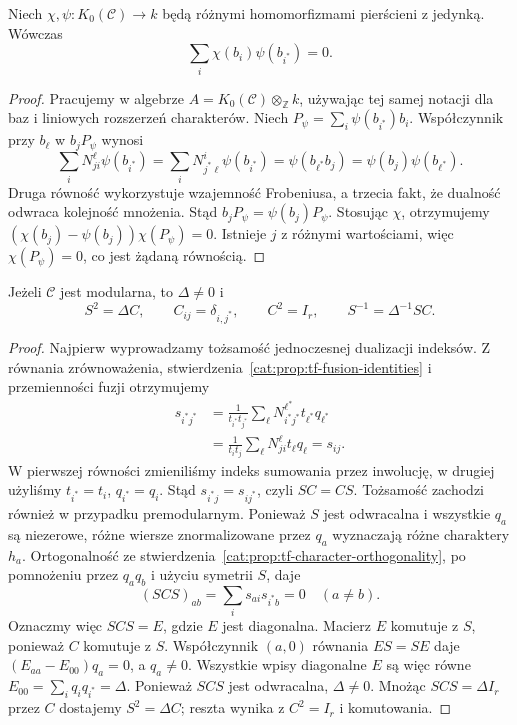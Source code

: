 \begin{stwierdzenie}\label{cat:prop:tf-character-orthogonality}
Niech $\chi,\psi:K_0(\mathcal C)\to k$ będą różnymi homomorfizmami pierścieni z jedynką. Wówczas
\[
 \sum_i\chi(b_i)\psi(b_{i^*})=0.
\]
\end{stwierdzenie}
\begin{proof}
Pracujemy w algebrze $A=K_0(\mathcal C)\otimes_{\mathbb Z}k$, używając tej samej notacji dla baz i liniowych rozszerzeń charakterów. Niech
$P_\psi=\sum_i\psi(b_{i^*})b_i$.
Współczynnik przy $b_\ell$ w $b_jP_\psi$ wynosi
\[
 \sum_i N_{ji}^{\ell}\psi(b_{i^*})
 =\sum_i N_{j^*\ell}^{i}\psi(b_{i^*})
 =\psi(b_{\ell^*}b_j)
 =\psi(b_j)\psi(b_{\ell^*}).
\]
Druga równość wykorzystuje wzajemność Frobeniusa, a trzecia fakt, że dualność odwraca kolejność mnożenia. Stąd $b_jP_\psi=\psi(b_j)P_\psi$. Stosując $\chi$, otrzymujemy $(\chi(b_j)-\psi(b_j))\chi(P_\psi)=0$. Istnieje $j$ z różnymi wartościami, więc $\chi(P_\psi)=0$, co jest żądaną równością.
\end{proof}

\begin{twierdzenie}\label{cat:thm:tf-s-square}
Jeżeli $\mathcal C$ jest modularna, to $\Delta\neq0$ i
\[
 S^2=\Delta C,\qquad
 C_{ij}=\delta_{i,j^*},\qquad C^2=I_r,
 \qquad S^{-1}=\Delta^{-1}SC.
\]
\end{twierdzenie}
\begin{proof}
Najpierw wyprowadzamy tożsamość jednoczesnej dualizacji indeksów. Z równania zrównoważenia, stwierdzenia~\ref{cat:prop:tf-fusion-identities} i przemienności fuzji otrzymujemy
\[
\begin{aligned}
 s_{i^*j^*}
 &=\frac{1}{t_{i^*}t_{j^*}}
   \sum_\ell N_{i^*j^*}^{\ell^*}t_{\ell^*}q_{\ell^*}\\
 &=\frac{1}{t_it_j}\sum_\ell N_{ji}^{\ell}t_\ell q_\ell
 =s_{ij}.
\end{aligned}
\]
W pierwszej równości zmieniliśmy indeks sumowania przez inwolucję, w drugiej użyliśmy $t_{i^*}=t_i$, $q_{i^*}=q_i$. Stąd $s_{i^*j}=s_{ij^*}$, czyli $SC=CS$. Tożsamość zachodzi również w przypadku premodularnym. Ponieważ $S$ jest odwracalna i wszystkie $q_a$ są niezerowe, różne wiersze znormalizowane przez $q_a$ wyznaczają różne charaktery $h_a$. Ortogonalność ze stwierdzenia~\ref{cat:prop:tf-character-orthogonality}, po pomnożeniu przez $q_aq_b$ i użyciu symetrii $S$, daje
\[
 (SCS)_{ab}=\sum_i s_{ai}s_{i^*b}=0\quad(a\neq b).
\]
Oznaczmy więc $SCS=E$, gdzie $E$ jest diagonalna. Macierz $E$ komutuje z $S$, ponieważ $C$ komutuje z $S$. Współczynnik $(a,0)$ równania $ES=SE$ daje $(E_{aa}-E_{00})q_a=0$, a $q_a\neq0$. Wszystkie wpisy diagonalne $E$ są więc równe $E_{00}=\sum_i q_i q_{i^*}=\Delta$. Ponieważ $SCS$ jest odwracalna, $\Delta\neq0$. Mnożąc $SCS=\Delta I_r$ przez $C$ dostajemy $S^2=\Delta C$; reszta wynika z $C^2=I_r$ i komutowania.
\end{proof}


